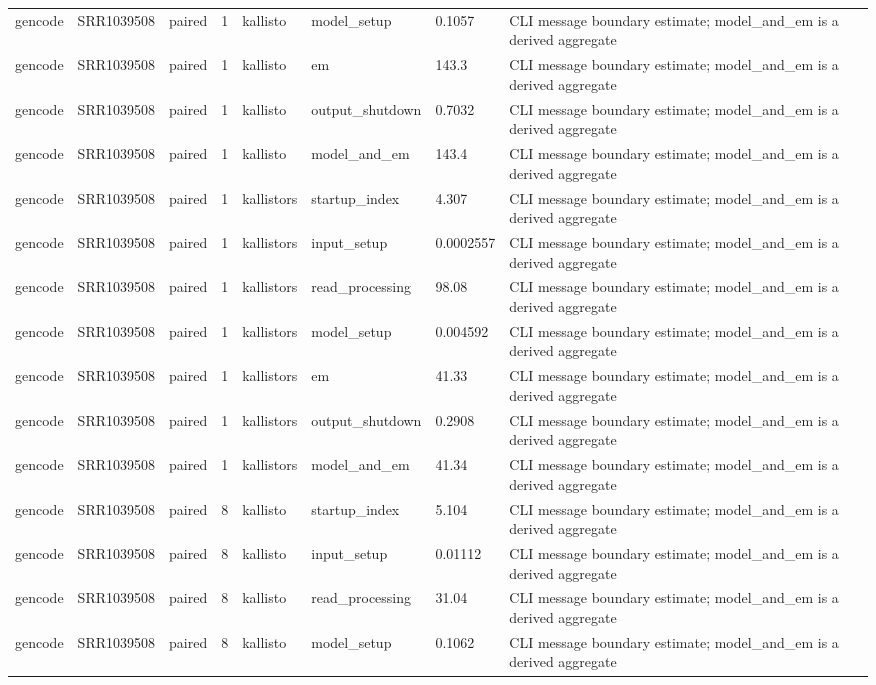 \begin{tabular}{llllllll}
gencode & SRR1039508 & paired & 1 & kallisto & model\_setup & 0.1057 & CLI message boundary estimate; model\_and\_em is a derived aggregate \\
gencode & SRR1039508 & paired & 1 & kallisto & em & 143.3 & CLI message boundary estimate; model\_and\_em is a derived aggregate \\
gencode & SRR1039508 & paired & 1 & kallisto & output\_shutdown & 0.7032 & CLI message boundary estimate; model\_and\_em is a derived aggregate \\
gencode & SRR1039508 & paired & 1 & kallisto & model\_and\_em & 143.4 & CLI message boundary estimate; model\_and\_em is a derived aggregate \\
gencode & SRR1039508 & paired & 1 & kallistors & startup\_index & 4.307 & CLI message boundary estimate; model\_and\_em is a derived aggregate \\
gencode & SRR1039508 & paired & 1 & kallistors & input\_setup & 0.0002557 & CLI message boundary estimate; model\_and\_em is a derived aggregate \\
gencode & SRR1039508 & paired & 1 & kallistors & read\_processing & 98.08 & CLI message boundary estimate; model\_and\_em is a derived aggregate \\
gencode & SRR1039508 & paired & 1 & kallistors & model\_setup & 0.004592 & CLI message boundary estimate; model\_and\_em is a derived aggregate \\
gencode & SRR1039508 & paired & 1 & kallistors & em & 41.33 & CLI message boundary estimate; model\_and\_em is a derived aggregate \\
gencode & SRR1039508 & paired & 1 & kallistors & output\_shutdown & 0.2908 & CLI message boundary estimate; model\_and\_em is a derived aggregate \\
gencode & SRR1039508 & paired & 1 & kallistors & model\_and\_em & 41.34 & CLI message boundary estimate; model\_and\_em is a derived aggregate \\
gencode & SRR1039508 & paired & 8 & kallisto & startup\_index & 5.104 & CLI message boundary estimate; model\_and\_em is a derived aggregate \\
gencode & SRR1039508 & paired & 8 & kallisto & input\_setup & 0.01112 & CLI message boundary estimate; model\_and\_em is a derived aggregate \\
gencode & SRR1039508 & paired & 8 & kallisto & read\_processing & 31.04 & CLI message boundary estimate; model\_and\_em is a derived aggregate \\
gencode & SRR1039508 & paired & 8 & kallisto & model\_setup & 0.1062 & CLI message boundary estimate; model\_and\_em is a derived aggregate \\

\end{tabular}
